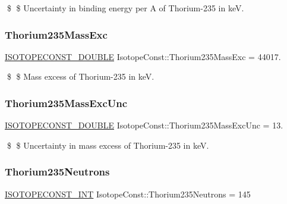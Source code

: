 \$ \$ Uncertainty in binding energy per A of Thorium-\/235 in keV. \mbox{\label{group___isotope_const-_thorium-_th235_ga83a1e65f8ef3a55f7b146cfc3fc61736}} 
\subsubsection{\texorpdfstring{Thorium235\+Mass\+Exc}{Thorium235MassExc}}
{\footnotesize\ttfamily \mbox{\hyperlink{group___isotope_const-_macros_ga8f45a7272ce02c0b4c65c44636ed719a}{I\+S\+O\+T\+O\+P\+E\+C\+O\+N\+S\+T\+\_\+\+D\+O\+U\+B\+LE}} Isotope\+Const\+::\+Thorium235\+Mass\+Exc = 44017.}

\$ \$ Mass excess of Thorium-\/235 in keV. \mbox{\label{group___isotope_const-_thorium-_th235_ga8889cc91646936562753faf5d657ddad}} 
\subsubsection{\texorpdfstring{Thorium235\+Mass\+Exc\+Unc}{Thorium235MassExcUnc}}
{\footnotesize\ttfamily \mbox{\hyperlink{group___isotope_const-_macros_ga8f45a7272ce02c0b4c65c44636ed719a}{I\+S\+O\+T\+O\+P\+E\+C\+O\+N\+S\+T\+\_\+\+D\+O\+U\+B\+LE}} Isotope\+Const\+::\+Thorium235\+Mass\+Exc\+Unc = 13.}

\$ \$ Uncertainty in mass excess of Thorium-\/235 in keV. \mbox{\label{group___isotope_const-_thorium-_th235_gafec150897b351690b491cef11074f160}} 
\subsubsection{\texorpdfstring{Thorium235\+Neutrons}{Thorium235Neutrons}}
{\footnotesize\ttfamily \mbox{\hyperlink{group___isotope_const-_macros_ga5f18360b3e99483a35c32d789e62621c}{I\+S\+O\+T\+O\+P\+E\+C\+O\+N\+S\+T\+\_\+\+I\+NT}} Isotope\+Const\+::\+Thorium235\+Neutrons = 145}

